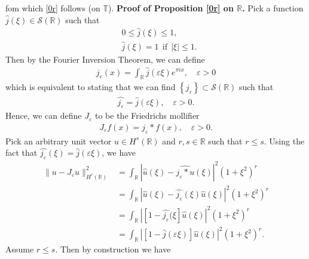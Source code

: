 \documentclass[12pt,reqno]{amsart}
\newcommand{\rr}{\mathbb{R}}
\newcommand{\ci}{\mathbb{T}}
\newcommand{\ee}{\varepsilon}
\theoremstyle{plain}  %
\theoremstyle{definition}
\begin{document}
fom which \eqref{0r} follows (on $\ci$).
\vskip0.1in
%
%
%
{\bf Proof of Proposition \ref{0r} on $\rr$.}
Pick a function $\widehat{j}(\xi) \in \mathcal{S}(\rr)$ such that
	\begin{equation}
		\label{p0u}
		\begin{split}
			& 0 \le \widehat{j}(\xi) \le 1,
			\\
			& \widehat{j}(\xi) = 1 \ \ \text{if} \ \ |\xi| \le 1.
		\end{split}
	\end{equation}
	Then by the Fourier Inversion Theorem, we can define
	\begin{equation}
		\begin{split}
			j_\ee (x) {=} \int_{\rr}
			\widehat{j}(\ee \xi) e^{\pi i x}, \quad \ee > 0
			\label{pparseval-def}
		\end{split}
	\end{equation}
	which is equivalent to stating that we can find $\left\{ j_\ee
	\right\} \subset \mathcal{S}(\rr)$ such that
	\begin{equation}
		\begin{split}
			\widehat{j_\ee} = \widehat{j }(\ee \xi), \quad \ee > 0.
			\label{pwidehat-def}
		\end{split}
	\end{equation}
	Hence, we can define $J_\ee$ to be the Friedrichs mollifier 
	\begin{equation}
		\label{p0'u}
		\begin{split}
			J_\ee f(x) = j_\ee * f(x), \quad \ee>0.
		\end{split}
	\end{equation}
Pick an arbitrary unit vector $u \in H^s(\rr)$ and
	$r, s \in \rr$ such that $r \le s$. Using the fact that
$\widehat{j_\ee}(\xi) = \widehat{j}(\ee \xi)$, we have
\begin{equation}
	\begin{split}
		\|u - J_\ee u\|_{H^r(\rr)}^2 
		& = \int_{\rr} |\widehat{u}(\xi) - \widehat{j_\ee * u}(\xi) |^2
		(1+\xi^2)^r
		\\
		& = \int_{\rr} |\widehat{u}(\xi) - \widehat{j_\ee}(\xi)
		\widehat{u}(\xi) |^2 (1+\xi^2)^r
		\\
		& = \int_{\rr} | [1- \widehat{j_\ee}(\xi] \widehat{u}(\xi) |^2
		(1+\xi^2)^r
		\\
		& = \int_{\rr} | [1- \widehat{j}(\ee \xi)] \widehat{u}(\xi) |^2
		(1+\xi^2)^r.
		\label{p1r}
	\end{split}
\end{equation}
Assume $r \le s$. Then by construction we have
\end{document}
